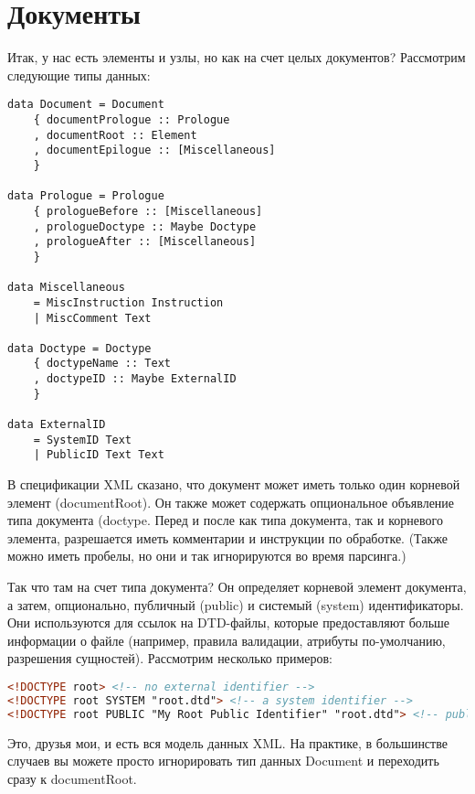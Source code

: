 \section{Документы} %

Итак, у нас есть элементы и узлы, но как на счет целых документов? Рассмотрим следующие типы данных: %

\begin{lstlisting}
data Document = Document
    { documentPrologue :: Prologue
    , documentRoot :: Element
    , documentEpilogue :: [Miscellaneous]
    }

data Prologue = Prologue
    { prologueBefore :: [Miscellaneous]
    , prologueDoctype :: Maybe Doctype
    , prologueAfter :: [Miscellaneous]
    }

data Miscellaneous
    = MiscInstruction Instruction
    | MiscComment Text

data Doctype = Doctype
    { doctypeName :: Text
    , doctypeID :: Maybe ExternalID
    }

data ExternalID
    = SystemID Text
    | PublicID Text Text
\end{lstlisting}

В спецификации XML сказано, что документ может иметь только один корневой элемент (documentRoot). Он также может содержать опциональное объявление типа документа (doctype. Перед и после как типа документа, так и корневого элемента, разрешается иметь комментарии и инструкции по обработке. (Также можно иметь пробелы, но они и так игнорируются во время парсинга.)

Так что там на счет типа документа? Он определяет корневой элемент документа, а затем, опционально, публичный (public) и системый (system) идентификаторы. Они используются для ссылок на DTD-файлы, которые предоставляют больше информации о файле (например, правила валидации, атрибуты по-умолчанию, разрешения сущностей). Рассмотрим несколько примеров:

\begin{lstlisting}[language=HTML]
<!DOCTYPE root> <!-- no external identifier -->
<!DOCTYPE root SYSTEM "root.dtd"> <!-- a system identifier -->
<!DOCTYPE root PUBLIC "My Root Public Identifier" "root.dtd"> <!-- public identifiers have a system ID as well -->
\end{lstlisting}

Это, друзья мои, и есть вся модель данных XML. На практике, в большинстве случаев вы можете просто игнорировать тип данных Document и переходить сразу к documentRoot.

